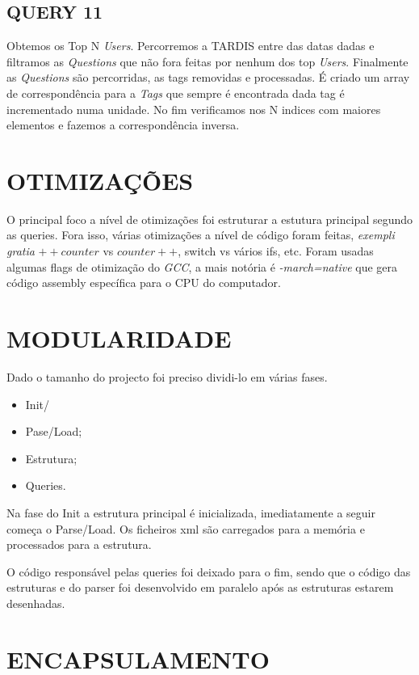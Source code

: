 \documentclass[letterpaper, 10 pt, conference]{IEEEtran}  %
\begin{document}
\subsection{QUERY 11}

Obtemos os Top N \textit{Users}.
Percorremos a TARDIS entre das datas dadas e filtramos as \textit{Questions} que não fora feitas por nenhum dos top \textit{Users}. Finalmente as \textit{Questions} são percorridas, as tags removidas e processadas.
É criado um array de correspondência para a \textit{Tags} que sempre é encontrada dada tag é incrementado numa unidade. No fim verificamos nos N indices com maiores elementos e fazemos a correspondência inversa.


\section{OTIMIZAÇÕES}

O principal foco a nível de otimizações foi estruturar a estutura principal segundo as queries. Fora isso, várias otimizações a nível de código foram feitas, \textit{exempli gratia} $++counter$ vs $counter++$, switch vs vários ifs, etc.
Foram usadas algumas flags de otimização do \textit{GCC}, a mais notória é \textit{-march=native} que gera código assembly específica para o CPU do computador.

\section{MODULARIDADE}

Dado o tamanho do projecto foi preciso dividi-lo em várias fases.

\begin{itemize}
\item Init/
\item Pase/Load;
\item Estrutura;
\item Queries.
\end{itemize}

Na fase do Init a estrutura principal é inicializada, imediatamente a seguir começa o Parse/Load. Os ficheiros xml são carregados para a memória e processados para a estrutura.

O código responsável pelas queries foi deixado para o fim, sendo que o código das estruturas e do parser foi desenvolvido em paralelo após as estruturas estarem desenhadas.




\section{ENCAPSULAMENTO}
\end{document}
